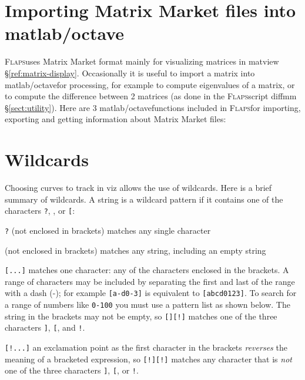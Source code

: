 \documentclass[11pt,openany,twoside]{book}
\numberwithin{equation}{section}		%
\newcommand{\Cmd}[1]{{\sf #1}}
\newcommand{\Code}[1]{{\small\tt #1}}
\newcommand{\Flaps}{\textsc{Flaps\:}}
\newcommand{\Octlab}{\Cmd{matlab}/\Cmd{octave}\:}
\newcommand{\Sectref}[1]{\S\ref{#1}}
\begin{document}
\newpage
\section{Importing Matrix Market files into \Octlab}\label{sect:mm-matlab}
\Flaps uses Matrix Market format mainly for visualizing matrices
in \Cmd{matview} \Sectref{ref:matrix-display}.
Occasionally it is useful to import a matrix into \Octlab for processing,
for example to compute eigenvalues of a matrix, or to compute the
difference between 2 matrices (as done in the \Flaps script
\Cmd{diffmm} \Sectref{sect:utility}).
Here are 3 \Octlab functions included in \Flaps for importing,
exporting and getting information about Matrix Market files: 
 		

\newpage
\section{Wildcards}\label{app:wildcards}
Choosing curves to track in \Cmd{viz} allows the use of wildcards.
Here is a brief summary of wildcards.
A string is a wildcard pattern if it contains one of the characters
\Code{?}, \Code{*}, or \verb+[+:
	\begin{description}
		\item{\Code{?}} (not enclosed in brackets) matches any single character
		\item{\Code{*}} (not enclosed in brackets) matches any string,
				including an empty string
		\item{\Code{[...]}} matches one character: any of the characters
			enclosed in the brackets. A range of characters may be included by
			separating the first and last of the range with a dash (-); for
			example \verb+[a-d0-3]+ is equivalent to \verb+[abcd0123]+.
			To search for a range of numbers like \verb+0-100+ you must
			use a pattern list as shown below.
			The string in the brackets may not be empty, so \verb+[][!]+ matches
			one of the three characters \verb+]+, \verb+[+, and \Code{!}.
		\item{\Code{[!...]}} an exclamation point as the first character in
			the brackets \emph{reverses} the meaning of a
			bracketed expression, so \verb+[!][!]+ matches any character that
			is \emph{not} one of the three characters \verb+]+, \verb+[+, or \Code{!}.
	\end{description}
\end{document}
